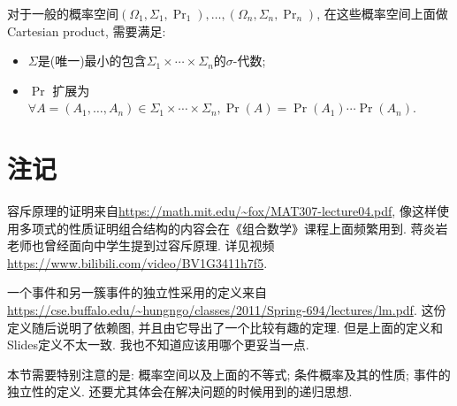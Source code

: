 \documentclass{ctexart}
\begin{document}
对于一般的概率空间$\left(\Omega_1, \Sigma_1, \operatorname{Pr}_1\right), \ldots,\left(\Omega_n, \Sigma_n, \operatorname{Pr}_n\right)$, 在这些概率空间上面做Cartesian product, 需要满足: 
\begin{itemize}
    \item $\Sigma$是(唯一)最小的包含$\Sigma_1 \times \cdots \times \Sigma_n$的$\sigma$-代数;
    \item $\Pr$ 扩展为$\forall A=\left(A_1, \ldots, A_n\right) \in \Sigma_1 \times \cdots \times \Sigma_n, \operatorname{Pr}(A)=\operatorname{Pr}\left(A_1\right) \cdots \operatorname{Pr}\left(A_n\right)$. 
\end{itemize}


\section*{注记}

容斥原理的证明来自\url{https://math.mit.edu/~fox/MAT307-lecture04.pdf}, 像这样使用多项式的性质证明组合结构的内容会在《组合数学》课程上面频繁用到. 蒋炎岩老师也曾经面向中学生提到过容斥原理. 详见视频\url{https://www.bilibili.com/video/BV1G3411h7f5}.

一个事件和另一簇事件的独立性采用的定义来自\url{https://cse.buffalo.edu/~hungngo/classes/2011/Spring-694/lectures/lm.pdf}. 这份定义随后说明了依赖图, 并且由它导出了一个比较有趣的定理. 但是上面的定义和Slides定义不太一致. 我也不知道应该用哪个更妥当一点. 

本节需要特别注意的是: 概率空间以及上面的不等式; 条件概率及其的性质; 事件的独立性的定义. 还要尤其体会在解决问题的时候用到的递归思想. 
\end{document}
